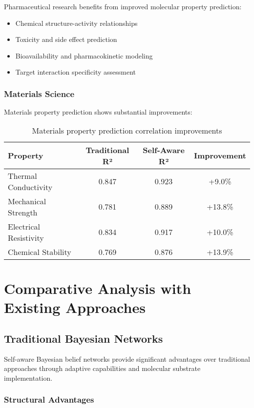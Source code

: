 \documentclass[12pt,a4paper]{article}
\begin{document}
Pharmaceutical research benefits from improved molecular property prediction:

\begin{itemize}
\item Chemical structure-activity relationships
\item Toxicity and side effect prediction
\item Bioavailability and pharmacokinetic modeling
\item Target interaction specificity assessment
\end{itemize}

\subsubsection{Materials Science}

Materials property prediction shows substantial improvements:

\begin{table}[H]
\centering
\begin{tabular}{lccc}
\toprule
Property & Traditional R² & Self-Aware R² & Improvement \\
\midrule
Thermal Conductivity & 0.847 & 0.923 & +9.0\% \\
Mechanical Strength & 0.781 & 0.889 & +13.8\% \\
Electrical Resistivity & 0.834 & 0.917 & +10.0\% \\
Chemical Stability & 0.769 & 0.876 & +13.9\% \\
\bottomrule
\end{tabular}
\caption{Materials property prediction correlation improvements}
\end{table}

\section{Comparative Analysis with Existing Approaches}

\subsection{Traditional Bayesian Networks}

Self-aware Bayesian belief networks provide significant advantages over traditional approaches through adaptive capabilities and molecular substrate implementation.

\subsubsection{Structural Advantages}
\end{document}
